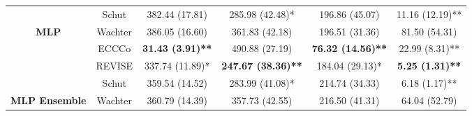 \begin{table}
{\begin{tabular}[t]{>{}cccccc}
 & Schut & 382.44 (17.81) & 285.98 (42.48)* & 196.86 (45.07) & 11.16 (12.19)**\\

\multirow{-4}{*}{\centering\arraybackslash \textbf{MLP}} & Wachter & 386.05 (16.60) & 361.83 (42.18) & 196.51 (31.36) & 81.50 (54.31)\\
\cmidrule{1-6}
 & ECCCo & \textbf{31.43 (3.91)**} & 490.88 (27.19) & \textbf{76.32 (14.56)**} & 22.99 (8.31)**\\

 & REVISE & 337.74 (11.89)* & \textbf{247.67 (38.36)**} & 184.04 (29.13)* & \textbf{5.25 (1.31)**}\\

 & Schut & 359.54 (14.52) & 283.99 (41.08)* & 214.74 (34.33) & 6.18 (1.17)**\\

\multirow{-4}{*}{\centering\arraybackslash \textbf{MLP Ensemble}} & Wachter & 360.79 (14.39) & 357.73 (42.55) & 216.50 (41.31) & 64.04 (52.79)\\
\bottomrule
\end{tabular}}
\end{table}
